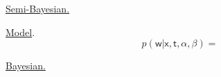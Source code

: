 \begin{enumerate}
\begin{enumerate}
\end{enumerate}



{\color{blue}\item \underline{Semi-Bayesian.}}  
\item \underline{Model}.
\begin{equation}
p(\mathsf{w}| \mathsf{x, t}, \alpha, \beta) = 
\end{equation}



{\color{blue}\item \underline{Bayesian.}} 


\end{enumerate}






